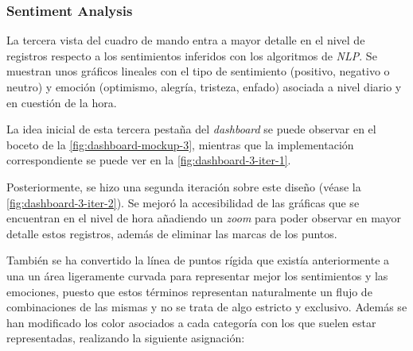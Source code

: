 

\subsubsection{Sentiment Analysis}

La tercera vista del cuadro de mando entra a mayor detalle en el nivel de registros respecto a los sentimientos inferidos con los algoritmos de \textit{NLP}. Se muestran unos gráficos lineales con el tipo de sentimiento (positivo, negativo o neutro) y emoción (optimismo, alegría, tristeza, enfado) asociada a nivel diario y en cuestión de la hora. 

La idea inicial de esta tercera pestaña del \textit{dashboard} se puede observar en el boceto de la \autoref{fig:dashboard-mockup-3}, mientras que la implementación correspondiente se puede ver en la \autoref{fig:dashboard-3-iter-1}.



Posteriormente, se hizo una segunda iteración sobre este diseño (véase la \autoref{fig:dashboard-3-iter-2}). Se mejoró la accesibilidad de las gráficas que se encuentran en el nivel de hora añadiendo un \textit{zoom} para poder observar en mayor detalle estos registros, además de eliminar las marcas de los puntos.

También se ha convertido la línea de puntos rígida que existía anteriormente a una un área ligeramente curvada para representar mejor los sentimientos y las emociones, puesto que estos términos representan naturalmente un flujo de combinaciones de las mismas y no se trata de algo estricto y exclusivo. Además se han modificado los color asociados a cada categoría con los que suelen estar representadas, realizando la siguiente asignación:

